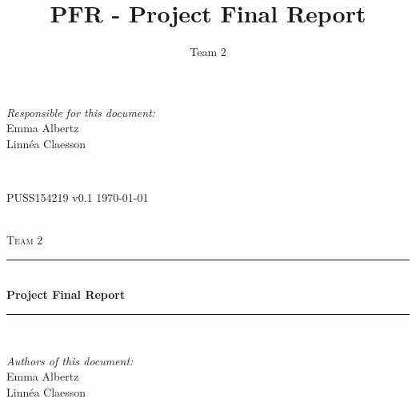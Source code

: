 \documentclass[a4paper]{article}
\title{PFR - Project Final Report}
\author{Team 2}
\begin{document}
\begin{titlepage}
\newcommand{\HRule}{\rule{\linewidth}{0.5mm}}

\begin{minipage}{0.5\textwidth}
\begin{flushleft} %
\textit{Responsible for this document:}\\
Emma Albertz \\
Linnéa Claesson
\end{flushleft}
\end{minipage}
~
\begin{minipage}{0.4\textwidth}
\begin{flushright}
PUSS154219 v0.1 
\today
\end{flushright}
\end{minipage}\\[3cm]

\centering
\textsc{\LARGE Team 2}\\[0.5cm]

\HRule \\[0.4cm]
{ \huge \bfseries Project Final Report}\\[0.4cm] %
\HRule \\[1.5cm]

\vfill
\begin{flushleft}
\textit{Authors of this document:}\\
Emma Albertz \\
Linnéa Claesson
\end{flushleft}



\end{titlepage}



%



\setcounter{tocdepth}{2}
\tableofcontents
\newpage
{}
\end{document}
